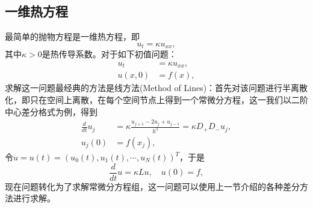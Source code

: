 \documentclass[a4paper,10pt]{ctexart}
\begin{document}
\subsection{一维热方程}
最简单的抛物方程是一维热方程，即
\begin{equation}
    u_t = \kappa u_{xx},
\end{equation}
其中$ \kappa>0 $是热传导系数。对于如下初值问题：
\begin{equation}
    \begin{aligned}
        u_t &= \kappa u_{xx},\\
        u(x,0) &= f(x),
    \end{aligned}
\end{equation}
求解这一问题最经典的方法是线方法(Method of Lines)：首先对该问题进行半离散化，即只在空间上离散，在每个空间节点上得到一个常微分方程，这一我们以二阶中心差分格式为例，得到
\begin{equation}
    \begin{aligned}
        \frac{d}{dt}u_j &= \kappa \frac{u_{j+1}-2u_j+u_{j-1}}{h^2} = \kappa D_+D_-u_j,\\
        u_j(0) &= f(x_j),
    \end{aligned}
\end{equation}
令$ u = u(t)= (u_0(t),u_1(t),\cdots ,u_N(t))^T $，于是
\begin{equation}
    \frac{d}{dt}u = \kappa Lu, \quad u(0) = f,
\end{equation}
现在问题转化为了求解常微分方程组，这一问题可以使用上一节介绍的各种差分方法进行求解。
\end{document}
